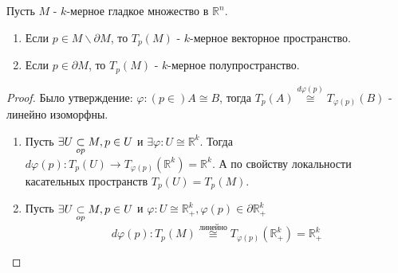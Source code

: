 \begin{statement*}
    Пусть $M$ - $k$-мерное гладкое множество в $\mathbb{R}^n$. 
    \begin{enumerate}
        \item Если $p \in M\backslash \partial M$, то $T_p(M)$ - $k$-мерное векторное пространство.
        \item Если $p \in \partial M$, то $T_p(M)$ - $k$-мерное полупространство.
    \end{enumerate}

    \begin{proof}
        Было утверждение: $\varphi: (p \in) A \cong B$, тогда $T_p(A) \overset{d\varphi(p)}{\cong} T_{\varphi(p)}(B)$ - линейно изоморфны.

        \begin{enumerate}
            \item Пусть $\exists U \underset{op}{\subset} M, p \in U$ и $\exists \varphi: U \cong \mathbb{R}^k$. Тогда $d\varphi(p):T_p(U) \to T_{\varphi(p)}(\mathbb{R}^k) = \mathbb{R}^k$. А по свойству локальности касательных пространств $T_p(U) = T_p(M)$.
            \item Пусть $\exists U \underset{op}{\subset} M, p \in U$ и $\varphi: U \cong \mathbb{R}^k_+, \varphi(p) \in \partial \mathbb{R}^k_+$
            \[d\varphi(p): T_p(M) \overset{\text{линейно}}{\cong} T_{\varphi(p)}(\mathbb{R}^k_+) = \mathbb{R}^k_+\]
        \end{enumerate}
    \end{proof}
\end{statement*}

